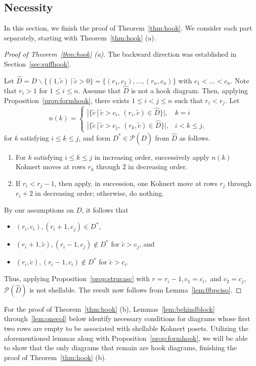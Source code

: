 \documentclass[letterpaper,10pt]{article}
\begin{document}
\subsection{Necessity}

In this section, we finish the proof of Theorem~\ref{thm:hook}. We consider each part separately, starting with Theorem~\ref{thm:hook} (a).

\begin{proof}[Proof of Theorem~\ref{thm:hook} \textup(a\textup)] The backward direction was established in Section~\ref{sec:suffhook}.

Let $\widehat{D}=D\backslash\{(1,\tilde{c})~|~\tilde{c}>0\}=\{(r_1,c_1),\hdots,(r_n,c_n)\}$ with $c_1<\hdots<c_n$. Note that $r_i>1$ for $1\le i\le n$. Assume that $\widehat{D}$ is not a hook diagram. Then, applying Proposition~\ref{prop:formhook}, there exists $1\le i<j\le n$ such that $r_i<r_j$. Let $$n(k)=\begin{cases}
    |\{\tilde{c}~|~\tilde{c}>c_i,~(r_i,\tilde{c})\in \widehat{D}\}|, & k=i \\
    |\{\tilde{c}~|~\tilde{c}>c_j,~(r_k,\tilde{c})\in \widehat{D}\}|, & i< k\le j,
\end{cases}$$
for $k$ satisfying $i\le k\le j$, and form $D^*\in \mathcal{P}(\widehat{D})$ from $\widehat{D}$ as follows.
\begin{enumerate}
    \item[1)] For $k$ satisfying $i\le k\le j$ in increasing order, successively apply $n(k)$ Kohnert moves at rows $r_k$ through $2$ in decreasing order.
    \item[2)] If $r_i<r_j-1$, then apply, in succession, one Kohnert move at rows $r_j$ through $r_i+2$ in decreasing order; otherwise, do nothing.
\end{enumerate}
By our assumptions on $D$, it follows that
\begin{itemize}
    \item $(r_i,c_i), (r_i+1,c_j)\in D^*$,
    \item $(r_i+1,\tilde{c}),(r_i-1,c_j)\notin D^*$ for $\tilde{c}>c_j$, and
    \item $(r_i,\tilde{c}),(r_i-1,c_i)\notin D^*$ for $\tilde{c}>c_i$.
\end{itemize}
Thus, applying Proposition~\ref{prop:strucasc} with $r=r_i-1, c_1=c_i,$ and $c_2=c_j$, $\mathcal{P}(\widehat{D})$ is not shellable. The result now follows from Lemma~\ref{lem:0bpciso}.
\end{proof}

For the proof of Theorem~\ref{thm:hook} (b), Lemmas~\ref{lem:behindblock} through~\ref{lem:onecol} below identify necessary conditions for diagrams whose first two rows are empty to be associated with shellable Kohnert posets. Utilizing the aforementioned lemmas along with Proposition~\ref{prop:formhook}, we will be able to show that the only diagrams that remain are hook diagrams, finishing the proof of Theorem~\ref{thm:hook} (b).
\end{document}
